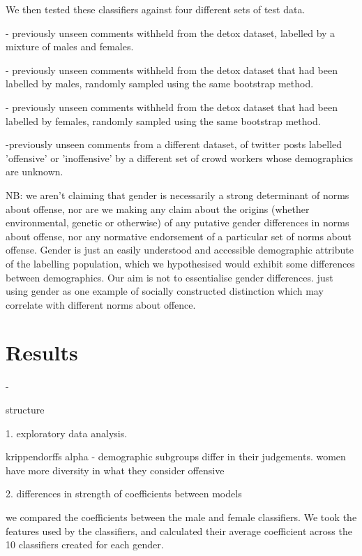 \documentclass[runningheads,a4paper]{llncs}
\begin{document}
We then tested these classifiers against four different sets of test data.

- previously unseen comments withheld from the detox dataset, labelled by a mixture of males and females.

- previously unseen comments withheld from the detox dataset that had been labelled by males, randomly sampled using the same bootstrap method.

- previously unseen comments withheld from the detox dataset that had been labelled by females, randomly sampled using the same bootstrap method.

-previously unseen comments from a different dataset, of twitter posts labelled 'offensive' or 'inoffensive' by a different set of crowd workers whose demographics are unknown.


NB: we aren't claiming that gender is necessarily a strong determinant of norms about offense, nor are we making any claim about the origins (whether environmental, genetic or otherwise) of any putative gender differences in norms about offense, nor any normative endorsement of a particular set of norms about offense. Gender is just an easily understood and accessible demographic attribute of the labelling population, which we hypothesised would exhibit some differences between demographics. Our aim is not to essentialise gender differences. just using gender as one example of socially constructed distinction which may correlate with different norms about offence.

\section{Results}





-

structure

1. exploratory data analysis.

krippendorffs alpha - demographic subgroups differ in their judgements.
women have more diversity in what they consider offensive

2. differences in strength of coefficients between models

we compared the coefficients between the male and female classifiers. We took the features used by the classifiers, and calculated their average coefficient across the 10 classifiers created for each gender. 
\end{document}
